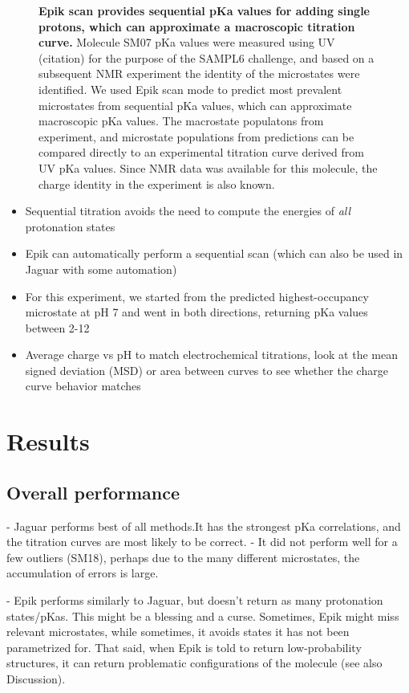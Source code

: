 \documentclass[9pt,lineno,final]{elife}
\begin{document}
\begin{figure}[H]
		\caption{{\bf Epik scan provides sequential pKa values for adding single protons, which can approximate a macroscopic titration curve.} Molecule SM07 pKa values were measured using UV (citation) for the purpose of the SAMPL6 challenge, and based on a subsequent NMR experiment the identity of the microstates were identified. We used Epik scan mode to predict most prevalent microstates from sequential pKa values, which can approximate macroscopic pKa values. The macrostate populatons from experiment, and microstate populations from predictions can be compared directly to an experimental titration curve derived from UV pKa values. Since NMR data was available for this molecule, the charge identity in the experiment is also known. 
	\label{fig:scan-prediction}}
	
\end{figure}


\begin{itemize}
	\item Sequential titration avoids the need to compute the energies of \emph{all} protonation states
	\item Epik can automatically perform a sequential scan (which can also be used in Jaguar with some automation)
	\item For this experiment, we started from the predicted highest-occupancy microstate at pH 7 and went in both directions, returning pKa values between 2-12
	\item Average charge vs pH to match electrochemical titrations, look at the mean signed deviation (MSD) or area between curves to see whether the charge curve behavior matches
\end{itemize}


\section{Results}

\subsection{Overall performance}
- Jaguar performs best of all methods.It has the strongest pKa correlations, and the titration curves are most likely to be correct.
- It did not perform well for a few outliers (SM18), perhaps due to the many different microstates, the accumulation of errors is large.


- Epik performs similarly to Jaguar, but doesn't return as many protonation states/pKas. This might be a blessing and a curse. Sometimes, Epik might miss relevant microstates, while sometimes,
it avoids states it has not been parametrized for. That said,
when Epik is told to return low-probability structures, it can return
problematic configurations of the molecule (see also Discussion).
\end{document}
